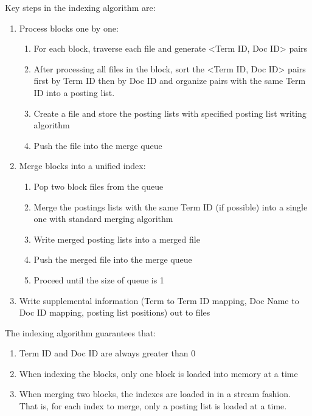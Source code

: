 \documentclass{article}
\begin{document}
Key steps in the indexing algorithm are:
\begin{enumerate}
  \item Process blocks one by one:
  \begin{enumerate}
    \item For each block, traverse each file and generate \textless Term ID, Doc ID\textgreater
    pairs
    
    \item After processing all files in the block, sort the \textless Term ID, Doc ID\textgreater
    pairs first by Term ID then by Doc ID and organize pairs with the same
    Term ID into a posting list.
    
    \item Create a file and store the posting lists with specified posting
    list writing algorithm
    
    \item Push the file into the merge queue
  \end{enumerate}
  \item Merge blocks into a unified index:
  \begin{enumerate}
    \item Pop two block files from the queue
    
    \item Merge the postings lists with the same Term ID (if possible) into a
    single one with standard merging algorithm
    
    \item Write merged posting lists into a merged file
    
    \item Push the merged file into the merge queue
    
    \item Proceed until the size of queue is 1
  \end{enumerate}
  \item Write supplemental information (Term to Term ID mapping, Doc Name to
  Doc ID mapping, posting list positions) out to files
\end{enumerate}
The indexing algorithm guarantees that:
\begin{enumerate}
  \item Term ID and Doc ID are always greater than 0
  
  \item When indexing the blocks, only one block is loaded into memory at a
  time
  
  \item When merging two blocks, the indexes are loaded in in a stream
  fashion. That is, for each index to merge, only a posting list is loaded at
  a time.
\end{enumerate}
\end{document}
